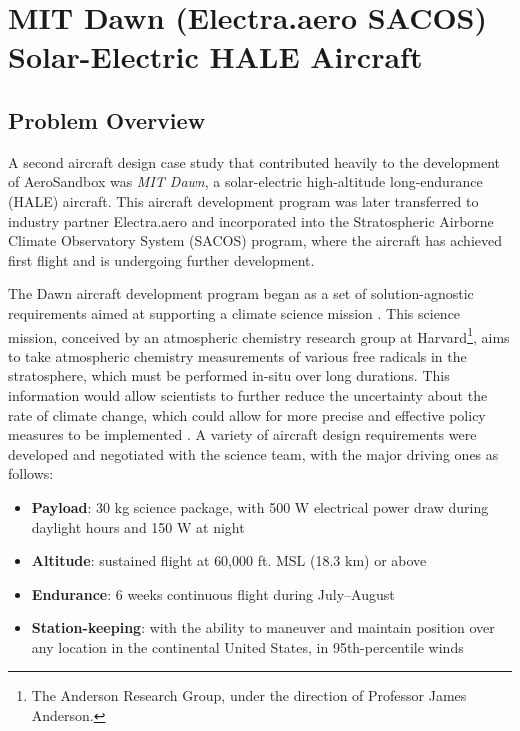 \section{MIT Dawn (Electra.aero SACOS) Solar-Electric HALE Aircraft}
\label{sec:dawn}

\subsection{Problem Overview}

A second aircraft design case study that contributed heavily to the development of AeroSandbox was \emph{MIT Dawn}, a solar-electric high-altitude long-endurance (HALE) aircraft. This aircraft development program was later transferred to industry partner Electra.aero and incorporated into the Stratospheric Airborne Climate Observatory System (SACOS) program, where the aircraft has achieved first flight and is undergoing further development.

The Dawn aircraft development program began as a set of solution-agnostic requirements aimed at supporting a climate science mission \cite{dewald_multidisciplinary_2023, sharpe_optimization_2021, avery_16_}. This science mission, conceived by an atmospheric chemistry research group at Harvard\footnote{The Anderson Research Group, under the direction of Professor James Anderson.}, aims to take atmospheric chemistry measurements of various free radicals in the stratosphere, which must be performed in-situ over long durations. This information would allow scientists to further reduce the uncertainty about the rate of climate change, which could allow for more precise and effective policy measures to be implemented \cite{dykema_feasibility_2023}. A variety of aircraft design requirements were developed and negotiated with the science team, with the major driving ones as follows:

\begin{itemize}[noitemsep]
    \item \textbf{Payload}: 30 kg science package, with 500 W electrical power draw during daylight hours and 150 W at night
    \item \textbf{Altitude}: sustained flight at 60,000 ft. MSL (18.3 km) or above
    \item \textbf{Endurance}: 6 weeks continuous flight during July–August
    \item \textbf{Station-keeping}: with the ability to maneuver and maintain position over any location in the continental United States, in 95th-percentile winds
\end{itemize}

